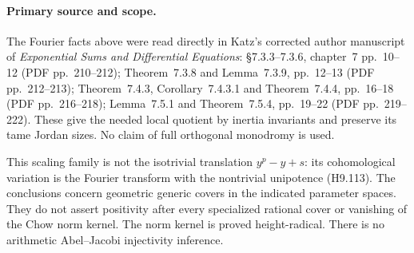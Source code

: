 \paragraph{Primary source and scope.}
The Fourier facts above were read directly in Katz's
corrected author manuscript of \emph{Exponential Sums
and Differential Equations}: \S7.3.3--7.3.6, chapter~7
pp.~10--12 (PDF pp.~210--212); Theorem~7.3.8 and
Lemma~7.3.9, pp.~12--13 (PDF pp.~212--213);
Theorem~7.4.3, Corollary~7.4.3.1 and Theorem~7.4.4,
pp.~16--18 (PDF pp.~216--218); Lemma~7.5.1 and
Theorem~7.5.4, pp.~19--22 (PDF pp.~219--222).
These give the needed local quotient by inertia
invariants and preserve its tame Jordan sizes. No
claim of full orthogonal monodromy is used.

This scaling family is not the isotrivial translation
$y^p-y+s$: its cohomological variation is the Fourier
transform with the nontrivial unipotence (H9.113).
The conclusions concern geometric generic covers in
the indicated parameter spaces. They do not assert
positivity after every specialized rational cover or
vanishing of the Chow norm kernel. The norm kernel is
proved height-radical. There is no arithmetic
Abel--Jacobi injectivity inference.
